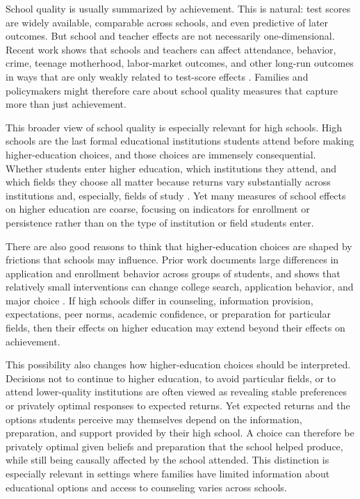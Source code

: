 \documentclass[a4paper, article, english, oneside, unknownkeysallowed, 12pt]{memoir}
\begin{document}
School quality is usually summarized by achievement.
This is natural: test scores are widely available, comparable across schools, and even predictive of later outcomes. \parencite{chetty_how_2011}
But school and teacher effects are not necessarily one-dimensional.
Recent work shows that schools and teachers can affect attendance, behavior, crime, teenage motherhood, labor-market outcomes, and other long-run outcomes in ways that are only weakly related to test-score effects \parencite{jackson_what_2018, beuermann_what_2023, rose_effects_2022, angrist_methods_2023}.
Families and policymakers might therefore care about school quality measures that capture more than just achievement.

This broader view of school quality is especially relevant for high schools.
High schools are the last formal educational institutions students attend before making higher-education choices, and those choices are immensely consequential.
Whether students enter higher education, which institutions they attend, and which fields they choose all matter because returns vary substantially across institutions and, especially, fields of study \parencite{kirkeboen_field_2016}.
Yet many measures of school effects on higher education are coarse, focusing on indicators for enrollment or persistence rather than on the type of institution or field students enter.

There are also good reasons to think that higher-education choices are shaped by frictions that schools may influence.
Prior work documents large differences in application and enrollment behavior across groups of students, and shows that relatively small interventions can change college search, application behavior, and major choice \parencite{hoxby_what_2015, dynarski_closing_2021, hastings_informed_2016, chetty_diversifying_2025}.
If high schools differ in counseling, information provision, expectations, peer norms, academic confidence, or preparation for particular fields, then their effects on higher education may extend beyond their effects on achievement.

This possibility also changes how higher-education choices should be interpreted.
Decisions not to continue to higher education, to avoid particular fields, or to attend lower-quality institutions are often viewed as revealing stable preferences or privately optimal responses to expected returns.
Yet expected returns and the options students perceive may themselves depend on the information, preparation, and support provided by their high school.
A choice can therefore be privately optimal given beliefs and preparation that the school helped produce, while still being causally affected by the school attended.
This distinction is especially relevant in settings where families have limited information about educational options and access to counseling varies across schools.
\end{document}
